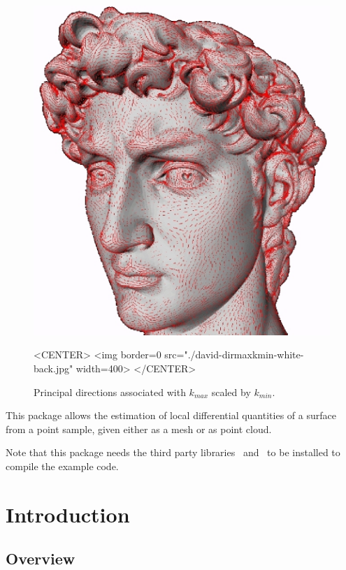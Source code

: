 
\begin{figure}[!ht]
\begin{ccTexOnly}
\centerline{
\includegraphics[width=.5\linewidth]{Jet_fitting_3/david-dirmaxkmin-jpg-white-back}}
\end{ccTexOnly}


\begin{ccHtmlOnly}
<CENTER> <img border=0 src="./david-dirmaxkmin-white-back.jpg" width=400>
</CENTER>
\end{ccHtmlOnly}
\caption{Principal directions associated with $k_{max}$ scaled by $k_{min}$.}
\label{fig:jet3:fig-david}
\end{figure}

This package allows the estimation of local differential quantities of
  a surface from a point sample, given either as a mesh or as point
  cloud.

Note that this package needs the third party libraries
\ccThirdPartyLapack\ and \ccThirdPartyBlas\ to be installed to compile
the example code.

\section{Introduction\label{sec:intro}}

\subsection{Overview}

